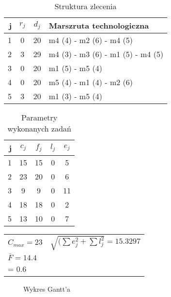 

	\begin{table}[htb]
		\centering
		\caption{Struktura zlecenia}
		\begin{tabular}{ | r | c | c | l | }
		\hline
		j	& \(r_j\)	& \(d_j\)	& Marszruta technologiczna	\\ \hline
		1	& 0	& 20	& m4 (4) - m2 (6) - m4 (5)	\\ \hline
		2	& 3	& 29	& m4 (3) - m3 (6) - m1 (5) - m4 (5)	\\ \hline
		3	& 0	& 20	& m1 (5) - m5 (4)	\\ \hline
		4	& 0	& 20	& m5 (4) - m1 (4) - m2 (6)	\\ \hline
		5	& 3	& 20	& m1 (3) - m5 (4)	\\ \hline
		\end{tabular}
	\end{table}


	\begin{table}[htb]
		\centering
		\caption{Parametry wykonanych zadań}
		\begin{tabular}{ | r | c | c | c | c |}
		\hline
		j	& \(c_j\)	& \(f_j\)	& \(l_j\)	& \(e_j\)	\\ \hline
		1	& 15	& 15	& 0	& 5	\\ \hline
		2	& 23	& 20	& 0	& 6	\\ \hline
		3	& 9	& 9	& 0	& 11	\\ \hline
		4	& 18	& 18	& 0	& 2	\\ \hline
		5	& 13	& 10	& 0	& 7	\\ \hline
		\end{tabular}
	\end{table}


	\begin{table}[htb]
		\centering
		\begin{tabular}{ l l }
		\(C_{max} = 23 \)	& \(\sqrt{(\sum e_j^2 + \sum l_j^2} = 15.3297\)	\\
		\(\bar{F} = 14.4 \)	& \( \alpha*\sum e_j + \beta*\sum l_j \Big|_{\substack{\alpha = 0.4\\ \beta = 0.6}} = 12.4 \)	\\ 
		\end{tabular}
	\end{table}
	\begin{figure}[htb]
		\centering
		\def\svgwidth{\columnwidth}
		
		\caption{Wykres Gantt'a}
	\end{figure}
	\FloatBarrier
